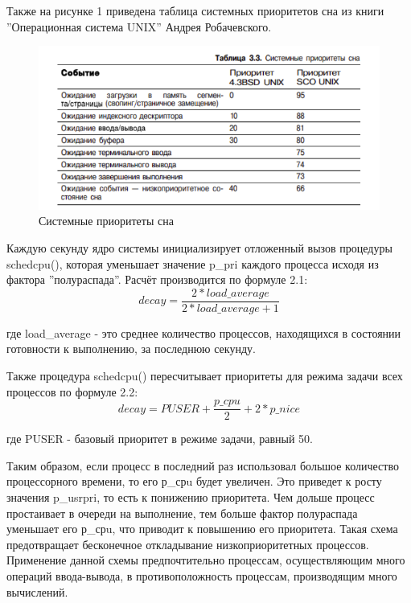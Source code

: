 Также на рисунке 1 приведена таблица системных приоритетов сна из книги ”Операционная система UNIX” Андрея Робачевского.
\FloatBarrier
\begin{figure}[h]
	\begin{center}
		\includegraphics[]{inc/rob.png}
	\end{center}
	\caption{Системные приоритеты сна}
\end{figure}
\FloatBarrier

Каждую секунду ядро системы инициализирует отложенный вызов процедуры schedcpu(), которая уменьшает значение p\_pri каждого процесса исходя из фактора ”полураспада”. Расчёт производится по формуле 2.1:
\begin{equation}
 {decay} = \frac{2 * {load\_average}}{2 * load\_average + 1}
\end{equation}

где load\_average - это среднее количество процессов, находящихся в состоянии готовности к выполнению, за последнюю секунду.

Также процедура schedcpu() пересчитывает приоритеты для режима задачи всех процессов по формуле 2.2:
\begin{equation}
{decay} = {PUSER} + \frac{{p\_cpu}}{2} + 2 * {p\_nice}
\end{equation}

где PUSER - базовый приоритет в режиме задачи, равный 50.

Таким образом, если процесс в последний раз использовал большое количество процессорного времени, то его р\_срu будет увеличен. 
Это приведет к росту значения p\_usrpri, то есть к понижению приоритета. 
Чем дольше процесс простаивает в очереди на выполнение, тем больше фактор полураспада уменьшает его р\_срu, что приводит к повышению его приоритета. 
Такая схема предотвращает бесконечное откладывание низкоприоритетных процессов. 
Применение данной схемы предпочтительно процессам, осуществляющим много операций ввода-вывода, в противоположность процессам, производящим много вычислений.

